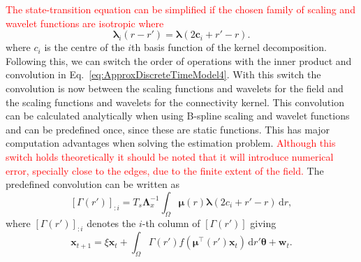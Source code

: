 \documentclass[review,authoryear,3p]{elsarticle}
\newcommand{\parham}[1]{\textcolor{red}{#1}}
\begin{document}
\parham{The state-transition equation can be simplified if the chosen family of scaling and wavelet functions are isotropic where}
\begin{equation}
	\boldsymbol{\lambda}_{i}(r-r') = \boldsymbol{\lambda}(2\mathbf{c}_{i}+r'-r). 
\end{equation}
where $c_i$ is the centre of the $i$th basis function of the kernel decomposition. Following this, we can switch the order of operations with the inner product and convolution in Eq.~\eqref{eq:ApproxDiscreteTimeModel4}. With this switch the convolution is now between the scaling functions and wavelets for the field and the scaling functions and wavelets for the connectivity kernel. This convolution can be calculated analytically when using B-spline scaling and wavelet functions and can be predefined once, since these are static functions. This has major computation advantages when solving the estimation problem. \parham{Although this switch holds theoretically it should be noted that it will introduce numerical error, specially close to the edges, due to the finite extent of the field. } The predefined convolution can be written as
\begin{equation}\label{eq:Gammaij}
	\left[\Gamma(r')\right]_{:i} = T_s \mathbf{\Lambda}_{x}^{-1}\int_{\Omega} \boldsymbol\mu\left(r\right)\boldsymbol\lambda\left(2c_{i} + r'-r\right) \,\mathrm{d}r,
\end{equation} 
 where $\left[\Gamma(r')\right]_{:i}$ denotes the $i$-th column of  $\left[\Gamma(r')\right]$ giving
\begin{equation}
	\mathbf{x}_{t+1} = 
	\xi \mathbf{x}_t + 
	\int_{\Omega} \Gamma\left(r'\right)f\left(\boldsymbol\mu^\top\left(r'\right) \mathbf{x}_t\right) 
	\, \mathrm{d}r' \boldsymbol\theta
	+ \mathbf w_t.
\end{equation}
\end{document}
